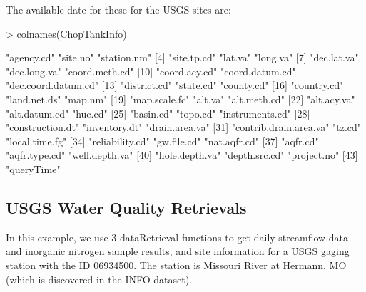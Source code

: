 \documentclass[a4paper,11pt]{article}
\begin{document}
The available date for these for the USGS sites are:
\begin{Schunk}
\begin{Sinput}
> colnames(ChopTankInfo)
\end{Sinput}
\begin{Soutput}
 [1] "agency.cd"             "site.no"               "station.nm"           
 [4] "site.tp.cd"            "lat.va"                "long.va"              
 [7] "dec.lat.va"            "dec.long.va"           "coord.meth.cd"        
[10] "coord.acy.cd"          "coord.datum.cd"        "dec.coord.datum.cd"   
[13] "district.cd"           "state.cd"              "county.cd"            
[16] "country.cd"            "land.net.ds"           "map.nm"               
[19] "map.scale.fc"          "alt.va"                "alt.meth.cd"          
[22] "alt.acy.va"            "alt.datum.cd"          "huc.cd"               
[25] "basin.cd"              "topo.cd"               "instruments.cd"       
[28] "construction.dt"       "inventory.dt"          "drain.area.va"        
[31] "contrib.drain.area.va" "tz.cd"                 "local.time.fg"        
[34] "reliability.cd"        "gw.file.cd"            "nat.aqfr.cd"          
[37] "aqfr.cd"               "aqfr.type.cd"          "well.depth.va"        
[40] "hole.depth.va"         "depth.src.cd"          "project.no"           
[43] "queryTime"            
\end{Soutput}
\end{Schunk}

\subsection{USGS Water Quality Retrievals}


In this example, we use 3 dataRetrieval functions to get daily streamflow data and inorganic nitrogen sample results, and site information for a USGS gaging station with the ID 06934500.  The station is Missouri River at Hermann, MO (which is discovered in the INFO dataset).
\end{document}
